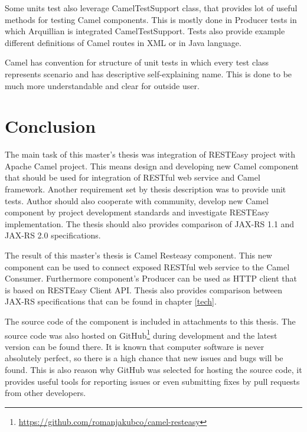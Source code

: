 \documentclass[12pt,final,oneside]{fithesis2}
\begin{document}
Some units test also leverage CamelTestSupport class, that provides lot of useful methods for testing Camel components. This is mostly done in Producer tests in which Arquillian is integrated CamelTestSupport. Tests also provide example different definitions of Camel routes in XML or in Java language.

Camel has convention for structure of unit tests in which every test class represents scenario and has descriptive self-explaining name. This is done to be much more understandable and clear for outside user. 


\chapter{Conclusion}
The main task of this master's thesis was integration of RESTEasy project with Apache Camel project. This means design and developing new Camel component that should be used for integration of RESTful web service and Camel framework. Another requirement set by thesis description was to provide unit tests. Author should also cooperate with community, develop new Camel component by project development standards and investigate RESTEasy implementation. The thesis should also provides comparison of JAX-RS 1.1 and JAX-RS 2.0 specifications.

The result of this master's thesis is Camel Resteasy component. This new component can be used to connect exposed RESTful web service to the Camel Consumer. Furthermore component's Producer can be used as HTTP client that is based on RESTEasy Client API. Thesis also provides comparison between JAX-RS specifications that can be found in chapter \ref{tech}. 

The source code of the component is included in attachments to this thesis. The source code was also hosted on GitHub\footnote{\url{https://github.com/romanjakubco/camel-resteasy}} during development and the latest version can be found there. It is known that computer software is never absolutely perfect, so there is a high chance that new issues and bugs will be found. This is also reason why GitHub was selected for hosting the source code, it provides useful tools for reporting issues or even submitting fixes by pull requests from other developers.  
\end{document}
